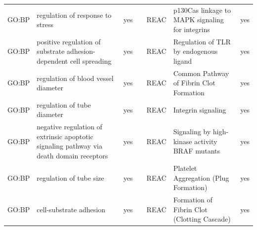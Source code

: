 \begin{longtable}{@{}lp{5cm}lllp{5cm}l@{}}
GO:BP           & regulation of response to stress                                                                                                   & yes              &           & REAC            & p130Cas linkage to MAPK signaling for integrins                                                                                                                        & yes              \\
GO:BP           & positive regulation of substrate adhesion-dependent cell spreading                      & yes              &           & REAC            & Regulation of TLR by endogenous ligand                                                                                                                                 & yes              \\
GO:BP           & regulation of blood vessel diameter                                                                                                & yes              &           & REAC            & Common Pathway of Fibrin Clot Formation                                                                                                                                & yes              \\
GO:BP           & regulation of tube diameter                                                                                                        & yes              &           & REAC            & Integrin signaling                                                                                                                                                     & yes              \\
GO:BP           & negative regulation of extrinsic apoptotic signaling pathway via death domain receptors & yes              &           & REAC            & Signaling by high-kinase activity BRAF mutants                                                                                                                         & yes              \\
GO:BP           & regulation of tube size                                                                                                            & yes              &           & REAC            & Platelet Aggregation (Plug Formation)                                                                                                                                  & yes              \\
GO:BP           & cell-substrate adhesion                                                                                                            & yes              &           & REAC            & Formation of Fibrin Clot (Clotting Cascade)                                                                                                                            & yes              \\

\end{longtable}
